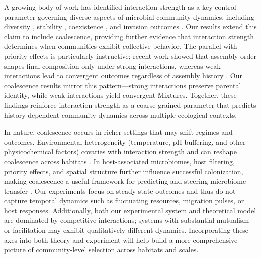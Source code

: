 A growing body of work has identified interaction strength as a key control parameter governing diverse aspects of microbial community dynamics, including diversity \citep{Hu2022, Marsland2019}, stability \citep{Allesina2012, Ratzke2020}, coexistence \citep{Grilli2017}, and invasion outcomes \citep{Hu2025, Kurkjian2021}. Our results extend this claim to include coalescence, providing further evidence that interaction strength determines when communities exhibit collective behavior. The parallel with priority effects is particularly instructive; recent work showed that assembly order shapes final composition only under strong interactions, whereas weak interactions lead to convergent outcomes regardless of assembly history \citep{Hu2025, Fukami2015}. Our coalescence results mirror this pattern---strong interactions preserve parental identity, while weak interactions yield convergent Mixtures. Together, these findings reinforce interaction strength as a coarse-grained parameter that predicts history-dependent community dynamics across multiple ecological contexts.

In nature, coalescence occurs in richer settings that may shift regimes and outcomes. Environmental heterogeneity (temperature, pH buffering, and other physicochemical factors) covaries with interaction strength and can reshape coalescence across habitats \citep{Rillig2015, Castledine2020, Rillig2017, Tropini2017}. In host-associated microbiomes, host filtering, priority effects, and spatial structure further influence successful colonization, making coalescence a useful framework for predicting and steering microbiome transfer \citep{Liu2024, Smillie2018, Rocca2021}. Our experiments focus on steady-state outcomes and thus do not capture temporal dynamics such as fluctuating resources, migration pulses, or host responses. Additionally, both our experimental system and theoretical model are dominated by competitive interactions; systems with substantial mutualism or facilitation may exhibit qualitatively different dynamics. Incorporating these axes into both theory and experiment will help build a more comprehensive picture of community-level selection across habitats and scales.

